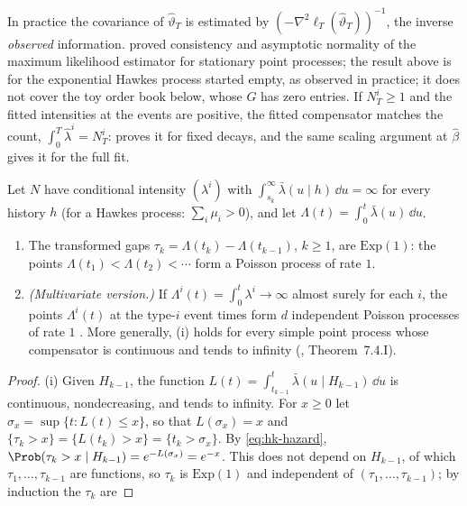 In practice the covariance of $\hat\vartheta_T$ is estimated by $(-\nabla^2\ell_T(\hat\vartheta_T))^{-1}$, the
inverse \emph{observed} information. \textcite{ogata-1978} proved consistency and asymptotic normality of the
maximum likelihood estimator for stationary point processes; the result above is for the exponential Hawkes process
started empty, as observed in practice; it does not cover the toy order book below, whose $G$ has zero entries.
If $N^i_T\ge1$ and the fitted intensities at the events are positive, the fitted compensator matches the count,
$\int_0^T\hat\lambda^i=N^i_T$:  proves it for fixed decays, and the same scaling argument at
$\hat\beta$ gives it for the full fit.

\begin{theorem}\label{thm:hk-time-change}
Let $N$ have conditional intensity $(\lambda^i)$ with $\int_{s_k}^\infty\bar\lambda(u\mid h)\,\dd u=\infty$ for every
history $h$ (for a Hawkes process: $\sum_i\mu_i>0$), and let $\Lambda(t)=\int_0^t\bar\lambda(u)\,\dd u$.
\begin{enumerate}[label=(\roman*)]
  \item The transformed gaps $\tau_k=\Lambda(t_k)-\Lambda(t_{k-1})$, $k\ge1$, are \iid $\mathrm{Exp}(1)$: the points
    $\Lambda(t_1)<\Lambda(t_2)<\cdots$ form a Poisson process of rate $1$.
  \item \emph{(Multivariate version.)} If $\Lambda^i(t)=\int_0^t\lambda^i\to\infty$ almost surely for each $i$, the
    points $\Lambda^i(t)$ at the type-$i$ event times form $d$ independent Poisson processes of rate $1$
    \citep{meyer-1971,brown-nair-1988}. More generally, (i) holds for every simple point process whose compensator
    is continuous and tends to infinity (\textcite{daley-vere-jones-2003}, Theorem~7.4.I).
\end{enumerate}
\end{theorem}

\begin{proof}
(i) Given $H_{k-1}$, the function $L(t)=\int_{t_{k-1}}^t\bar\lambda(u\mid H_{k-1})\,\dd u$ is continuous,
nondecreasing, and tends to infinity. For $x\ge0$ let $\sigma_x=\sup\{t:L(t)\le x\}$, so that $L(\sigma_x)=x$ and
$\{\tau_k>x\}=\{L(t_k)>x\}=\{t_k>\sigma_x\}$. By \eqref{eq:hk-hazard},
$\Prob(\tau_k>x\mid H_{k-1})=e^{-L(\sigma_x)}=e^{-x}$. This does not depend on $H_{k-1}$, of which
$\tau_1,\dots,\tau_{k-1}$ are functions, so $\tau_k$ is $\mathrm{Exp}(1)$ and independent of
$(\tau_1,\dots,\tau_{k-1})$; by induction the $\tau_k$ are \iid
\end{proof}

